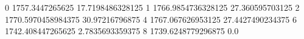 0 1757.3447265625 17.7198486328125
1 1766.9854736328125 27.360595703125
2 1770.5970458984375 30.97216796875
4 1767.067626953125 27.4427490234375
6 1742.408447265625 2.7835693359375
8 1739.6248779296875 0.0
